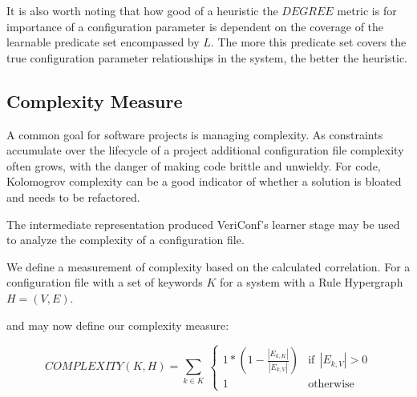 It is also worth noting that how good of a heuristic the $DEGREE$ metric is for
importance of a configuration parameter is dependent on the coverage
of the learnable predicate set encompassed by $L$. The more this predicate
set covers the true configuration parameter relationships in the system,
the better the heuristic.

\iffalse

Intuitively, keywords that are seen together more often with defined relationships are more likely to generate rules within the learner.
 (it would be nice to show this with a quick derivation)

for a rule to be considered *true*, two conditions must hold:

1) adequate support -we have seen the keywords together x number of times

2) adequate confidence - how many times out of the x number of times was the relationship true?

\fi

\iffalse
- Open Questions
> What is the difference between {\it important} rules and
  {\it rules we are more sure about}?

> Why doesn't everything just sum to zero?

\fi
\subsection{Complexity Measure}

A common goal for software projects is managing complexity. As
constraints accumulate over the lifecycle of a project additional
configuration file complexity often grows, with the danger of
making code brittle and unwieldy. For code, Kolomogrov complexity
can be a good indicator of whether a solution is bloated and 
needs to be refactored.

The intermediate representation produced VeriConf's learner stage
may be used to analyze the complexity of a configuration file.


We define a measurement of complexity based on the calculated correlation.
For a configuration file with a set of keywords $K$ for a system
with a Rule Hypergraph $H = (V, E)$.

and may now define our complexity measure:

\begin{equation}
    COMPLEXITY(K, H) = \sum_{k \in K} \
        \begin{cases}
            1 * (1 - \frac{|E_{k, K}|}{|E_{k, V}|}) & \text{if}\ \ |E_{k, V}| > 0 \\
            1 & \text{otherwise}
        \end{cases}
\end{equation}

